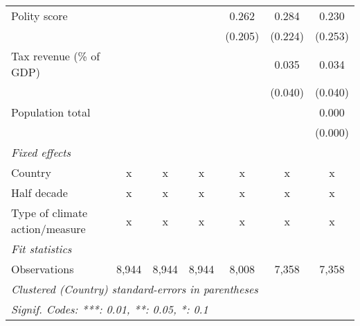 \begin{tabular}{lcccccc}
   Polity score                                                        &         &         &               & 0.262         & 0.284        & 0.230\\   
                                                                       &         &         &               & (0.205)       & (0.224)      & (0.253)\\   
   Tax revenue (\% of GDP)                                             &         &         &               &               & 0.035        & 0.034\\   
                                                                       &         &         &               &               & (0.040)      & (0.040)\\   
   Population total                                                    &         &         &               &               &              & 0.000\\   
                                                                       &         &         &               &               &              & (0.000)\\   
   \emph{Fixed effects}\\
   Country                                                             & x       & x       & x             & x             & x            & x\\  
   Half decade                                                         & x       & x       & x             & x             & x            & x\\  
   Type of climate action/measure                                      & x       & x       & x             & x             & x            & x\\  
   \midrule \emph{Fit statistics}\\
   Observations                                                        & 8,944   & 8,944   & 8,944         & 8,008         & 7,358        & 7,358\\  
   \midrule
   \multicolumn{7}{l}{\emph{Clustered (Country) standard-errors in parentheses}}\\
   \multicolumn{7}{l}{\emph{Signif. Codes: ***: 0.01, **: 0.05, *: 0.1}}\\
\end{tabular}
\par\endgroup


